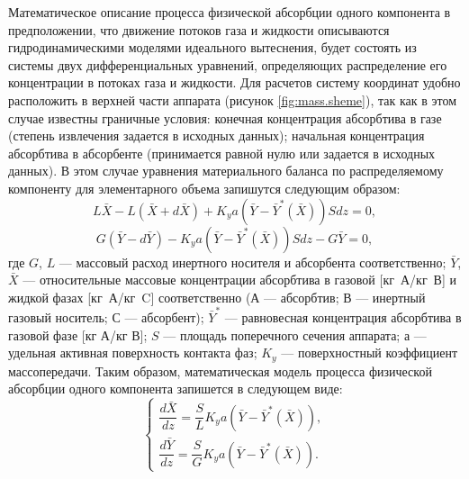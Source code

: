 Математическое описание процесса физической абсорбции одного компонента в предположении, что движение потоков газа и жидкости описываются гидродинамическими моделями идеального вытеснения, будет состоять из системы двух дифференциальных уравнений, определяющих распределение его концентрации в потоках газа и жидкости. Для расчетов систему координат удобно расположить в верхней части аппарата (рисунок \ref{fig:mass.sheme}), так как в этом случае известны граничные условия: конечная концентрация абсорбтива в газе (степень извлечения задается в исходных данных); начальная концентрация абсорбтива в абсорбенте (принимается равной нулю или задается в исходных данных). В этом случае уравнения материального баланса по распределяемому компоненту для элементарного объема  запишутся следующим образом:
\begin{equation}
	L \bar{X} - L(\bar{X} +d\bar{X}) + K_y a (\bar{Y}-\bar{Y}^*(\bar{X})) S dz=0, 
\end{equation}
\begin{equation}
	G(\bar{Y}-d\bar{Y})-K_y a (\bar{Y}-\bar{Y}^*(\bar{X}))Sdz- G\bar{Y}=0,
\end{equation}
где $G$, $L$ --- массовый расход инертного носителя и абсорбента соответственно; $\bar{Y}$, $\bar{X}$ --- относительные массовые концентрации абсорбтива в газовой [кг А/кг В] и жидкой фазах [кг А/кг C] соответственно (А --- абсорбтив; В --- инертный газовый носитель; С --- абсорбент); $\bar{Y}^*$ --- равновесная концентрация абсорбтива в газовой фазе [кг А/кг В]; $S$ --- площадь поперечного сечения аппарата; $а$ --- удельная активная поверхность контакта фаз; $K_y$ --- поверхностный коэффициент массопередачи. Таким образом, математическая модель процесса физической абсорбции одного компонента запишется в следующем виде:
\begin{equation} \label{eq.mass.fiz}
\left\lbrace 
\begin{gathered} 
\dfrac{d\bar{X}}{dz}=\dfrac{S}{L} K_y a (\bar{Y}-\bar{Y}^*(\bar{X})),
\\
\dfrac{d\bar{Y}}{dz}=\dfrac{S}{G} K_y a (\bar{Y}-\bar{Y}^*(\bar{X})).
\end{gathered} 
\right.
\end{equation}


